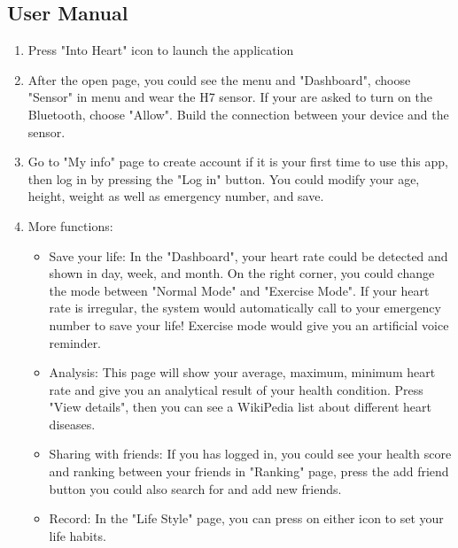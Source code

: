 \documentclass[10pt,a4paper,final]{scrartcl}
\begin{document}
\subsection{User Manual}
\begin{enumerate}
\item Press "Into Heart" icon to launch the application 
\item After the open page, you could see the menu and "Dashboard", choose "Sensor" in menu and wear the H7 sensor. If your are asked to turn on the Bluetooth, choose "Allow". Build the connection between your device and the sensor. 
\item Go to "My info" page to create account if it is your first time to use this app, then log in by pressing the "Log in" button. You could modify your age, height, weight as well as emergency number, and save.  
\item More functions: 
\begin{itemize}
\item Save your life: In the "Dashboard", your heart rate could be detected and shown in day, week, and month. On the right corner, you could change the mode between "Normal Mode" and "Exercise Mode". If your heart rate is irregular, the system would automatically call to your emergency number to save your life! Exercise mode would give you an artificial voice reminder. 
\item Analysis: This page will show your average, maximum, minimum heart rate and give you an analytical result of your health condition. Press "View details", then you can see a WikiPedia list about different heart diseases.  
\item Sharing with friends: If you has logged in, you could see your health score and ranking between your friends in "Ranking" page, press the add friend button you could also search for and add new friends. 
\item Record: In the "Life Style" page, you can press on either icon to set your life habits. 
\end{itemize}
\end{enumerate}

 
 
\end{document}
